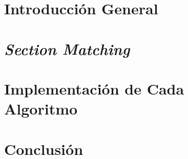 \documentclass[stu, 11pt, letterpaper, donotrepeattitle, floatsintext, natbib, helv]{apa7}
\begin{document}
\renewcommand{\listalgorithmname}{\largeÍndice de algoritmos}
\listofalgorithms
{}
\newpage


\begin{singlespace}
\section*{Introducción General}
{}

\section*{\textit{Section Matching}}%
{}

\section*{Implementación de Cada Algoritmo}
{}

\section*{Conclusión}
{}

\appendix

\cite{circuits}
\newpage
\renewcommand\refname{\large\textbf{Referencias}}

\end{singlespace}
\end{document}
